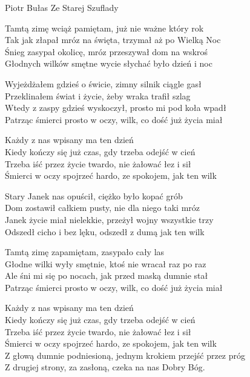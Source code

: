 {Piotr Bułas}
{Ze Starej Szuflady}
\begin{text}
Tamtą zimę wciąż pamiętam, już nie ważne który rok\\
Tak jak złapał mróz na święta, trzymał aż po Wielką Noc\\
Śnieg zasypał okolicę, mróz przeszywał dom na wskroś\\
Głodnych wilków smętne wycie słychać było dzień i noc

Wyjeżdżałem gdzieś o świcie, zimny silnik ciągle gasł\\
Przeklinałem świat i życie, żeby wraka trafił szlag\\
Wtedy z zaspy gdzieś wyskoczył, prosto mi pod koła wpadł\\
Patrząc śmierci prosto w oczy, wilk, co dość już życia miał

\vin Każdy z nas wpisany ma ten dzień\\
\vin Kiedy kończy się już czas, gdy trzeba odejść w cień\\
\vin Trzeba iść przez życie twardo, nie żałować łez i sił\\
\vin Śmierci w oczy spojrzeć hardo, ze spokojem, jak ten wilk

Stary Janek nas opuścił, ciężko było kopać grób\\
Dom zostawił całkiem pusty, nie dla niego taki mróz\\
Janek życie miał nielekkie, przeżył wojny wszystkie trzy\\
Odszedł cicho i bez lęku, odszedł z dumą jak ten wilk

Tamtą zimę zapamiętam, zasypało cały las\\
Głodne wilki wyły smętnie, ktoś nie wracał raz po raz\\
Ale śni mi się po nocach, jak przed maską dumnie stał\\
Patrząc śmierci prosto w oczy, wilk, co dość już życia miał

\vin Każdy z nas wpisany ma ten dzień\\
\vin Kiedy kończy się już czas, gdy trzeba odejść w cień\\
\vin Trzeba iść przez życie twardo, nie żałować łez i sił\\
\vin Śmierci w oczy spojrzeć hardo, ze spokojem, jak ten wilk\\
\vin Z głową dumnie podniesioną, jednym krokiem przejść przez próg\\
\vin Z drugiej strony, za zasłoną, czeka na nas Dobry Bóg.
\end{text}
